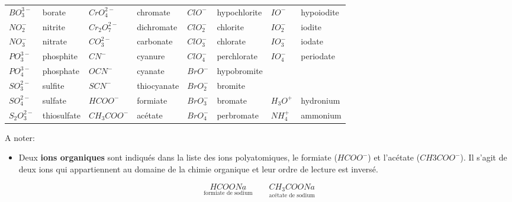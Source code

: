 \documentclass[
  11pt,
  a4paper,
  openany]{book}
\providecommand{\tightlist}{%
  \setlength{\itemsep}{0pt}\setlength{\parskip}{0pt}}
\begin{document}
\begin{longtable}[]{@{}
  >{\raggedright\arraybackslash}p{}
  >{\raggedright\arraybackslash}p{}
  >{\raggedright\arraybackslash}p{}
  >{\raggedright\arraybackslash}p{}
  >{\raggedright\arraybackslash}p{}
  >{\raggedright\arraybackslash}p{}
  >{\raggedright\arraybackslash}p{}
  >{\raggedright\arraybackslash}p{}@{}}
\toprule()
\endhead
\(BO_3^{3-}\) & borate & \(CrO_4^{2-}\) & chromate & \(ClO^{-}\) & hypochlorite & \(IO^{-}\) & hypoiodite \\
\(NO_2^{-}\) & nitrite & \(Cr_2O_7^{2-}\) & dichromate & \(ClO_2^{-}\) & chlorite & \(IO_2^{-}\) & iodite \\
\(NO_3^{-}\) & nitrate & \(CO_3^{2-}\) & carbonate & \(ClO_3^{-}\) & chlorate & \(IO_3^{-}\) & iodate \\
\(PO_3^{3-}\) & phosphite & \(CN^{-}\) & cyanure & \(ClO_4^{-}\) & perchlorate & \(IO_4^{-}\) & periodate \\
\(PO_4^{3-}\) & phosphate & \(OCN^{-}\) & cyanate & \(BrO^{-}\) & hypobromite & & \\
\(SO_3^{2-}\) & sulfite & \(SCN^{-}\) & thiocyanate & \(BrO_2^{-}\) & bromite & & \\
\(SO_4^{2-}\) & sulfate & \(HCOO^{-}\) & formiate & \(BrO_3^{-}\) & bromate & \(H_3O^{+}\) & hydronium \\
\(S_2O_3^{2-}\) & thiosulfate & \(CH_3COO^{-}\) & acétate & \(BrO_4^{-}\) & perbromate & \(NH_4^{+}\) & ammonium \\
\bottomrule()
\end{longtable}

A noter:

\begin{itemize}
\tightlist
\item
  Deux \textbf{ions organiques} sont indiqués dans la liste des ions polyatomiques, le formiate (\(HCOO^-\)) et l'acétate (\(CH3COO^-\)). Il s'agit de deux ions qui appartiennent au domaine de la chimie organique et leur ordre de lecture est inversé.
\end{itemize}

\[ \underset{\text{formiate de sodium}}{HCOONa} \qquad \underset{\text{acétate de sodium}}{CH_3COONa} \]
\end{document}

